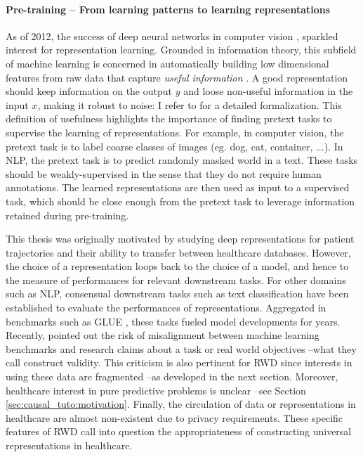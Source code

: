 \documentclass[french,12pt,twoside,a4paper]{book}
\begin{document}
\begin{background_box_left}

  \paragraph{Pre-training -- From learning patterns to learning representations}
  As of 2012, the success of deep neural networks in computer vision
  \citep{krizhevsky2012imagenet}, sparkled interest for representation learning.
  Grounded in information theory, this subfield of machine learning is concerned
  in automatically building low dimensional features from raw data that capture
  \emph{useful information} \citep{bengio2013representation}. A good
  representation should keep information on the output $y$ and loose non-useful
  information in the input $x$, making it robust to noise: I refer to
  \cite{achille2018emergence} for a detailed formalization. This definition of
  usefulness highlights the importance of finding pretext tasks to supervise the learning
  of representations. For example, in computer vision, the pretext task is to
  label coarse classes of images (eg. dog, cat, container, ...). In NLP, the
  pretext task is to predict randomly masked world in a text. These tasks should
  be weakly-supervised in the sense that they do not require human annotations.
  The learned representations are then used as input to a supervised task, which
  should be close enough from the pretext task to leverage information retained
  during pre-training.

  This thesis was originally motivated by studying deep representations for
  patient trajectories and their ability to transfer between healthcare
  databases. However, the choice of a representation loops back to the choice
  of a model, and hence to the measure of performances for relevant downstream
  tasks. For other domains such as NLP, consensual downstream tasks such as text
  classification have been established to evaluate the performances of
  representations. Aggregated in benchmarks such as GLUE \citep{wang2018glue},
  these tasks fueled model developments for years. Recently, \cite{raji2021ai}
  pointed out the risk of misalignment between machine learning benchmarks and
  research claims about a task or real world objectives --what they call
  construct validity. This criticism is also pertinent for RWD since interests
  in using these data are fragmented --as developed in the next section.
  Moreover, healthcare interest in pure predictive problems is unclear --see
  Section \ref{sec:causal_tuto:motivation}. Finally, the circulation of data or
  representations in healthcare are almost non-existent due to privacy
  requirements. These specific features of RWD call into question the
  appropriateness of constructing universal representations in healthcare.


\end{background_box_left}
\end{document}
